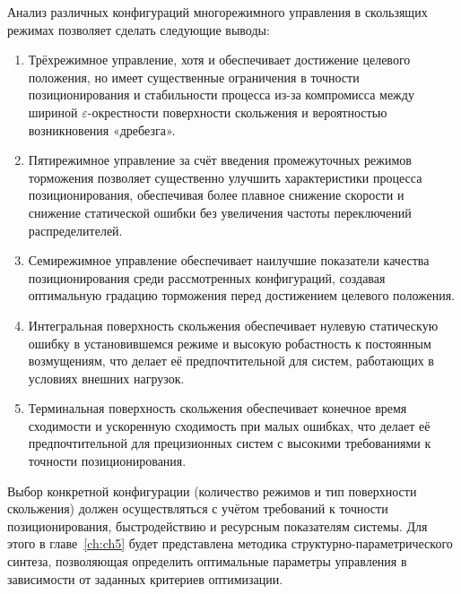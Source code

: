 Анализ различных конфигураций многорежимного управления в скользящих режимах позволяет сделать следующие выводы:

\begin{enumerate}
	\item Трёхрежимное управление, хотя и обеспечивает достижение целевого положения, но имеет существенные
	      ограничения в точности позиционирования и стабильности процесса из-за компромисса между шириной $\varepsilon$-окрестности
	      поверхности скольжения и вероятностью возникновения «дребезга».

	\item Пятирежимное управление за счёт введения промежуточных режимов торможения позволяет существенно
	      улучшить характеристики процесса позиционирования, обеспечивая более плавное снижение
	      скорости и снижение статической ошибки без увеличения частоты переключений распределителей.

	\item Семирежимное управление обеспечивает наилучшие показатели качества позиционирования
	      среди рассмотренных конфигураций, создавая оптимальную градацию торможения перед достижением целевого положения.

	\item Интегральная поверхность скольжения обеспечивает нулевую статическую ошибку в
	      установившемся режиме и высокую робастность к постоянным возмущениям, что делает её предпочтительной для систем, работающих в условиях внешних нагрузок.

	\item Терминальная поверхность скольжения обеспечивает конечное время сходимости и
	      ускоренную сходимость при малых ошибках, что делает её предпочтительной для прецизионных систем с высокими требованиями к точности позиционирования.
\end{enumerate}

Выбор конкретной конфигурации (количество режимов и тип поверхности скольжения) должен осуществляться с учётом
требований к точности позиционирования, быстродействию и ресурсным показателям системы. Для этого в главе~\ref{ch:ch5} будет
представлена методика структурно-параметрического синтеза, позволяющая определить оптимальные параметры управления в зависимости от заданных критериев оптимизации.
